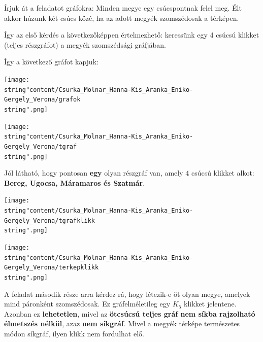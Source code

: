 \begin{solution}
	Írjuk át a feladatot gráfokra: Minden megye egy csúcspontnak
	felel meg. Élt akkor húzunk két csúcs közé, ha az adott megyék szomszédosak
	a térképen.
	
	Így az első kérdés a következőképpen értelmezhető: keressünk egy 4
	csúcsú klikket (teljes részgráfot) a megyék szomszédsági gráfjában.
	
	Így a következő gráfot kapjuk:
	\begin{center}
		\begin{minipage}[c]{0.45\textwidth}%
			\centering \texttt{[image: \\string"content/Csurka\_Molnar\_Hanna-Kis\_Aranka\_Eniko-Gergely\_Verona/grafok\\string".png]} %
		\end{minipage}\hfill{}%
		\begin{minipage}[c]{0.45\textwidth}%
			\centering \texttt{[image: \\string"content/Csurka\_Molnar\_Hanna-Kis\_Aranka\_Eniko-Gergely\_Verona/tgraf\\string".png]} %
		\end{minipage}
		\par\end{center}
	Jól látható, hogy pontosan \textbf{egy} olyan részgráf van, amely
	$4$ csúcsú klikket alkot: \textbf{Bereg, Ugocsa, Máramaros és Szatmár}.
	\begin{center}
		\begin{minipage}[c]{0.45\textwidth}%
			\centering \texttt{[image: \\string"content/Csurka\_Molnar\_Hanna-Kis\_Aranka\_Eniko-Gergely\_Verona/tgrafklikk\\string".png]} %
		\end{minipage}\hfill{}%
		\begin{minipage}[c]{0.45\textwidth}%
			\centering \texttt{[image: \\string"content/Csurka\_Molnar\_Hanna-Kis\_Aranka\_Eniko-Gergely\_Verona/terkepklikk\\string".png]} %
		\end{minipage}
		\par\end{center}
	\vspace{0.5cm}
	
	A feladat második része arra kérdez rá, hogy létezik-e öt olyan megye,
	amelyek mind páronként szomszédosak. Ez gráfelméletileg egy $K_{5}$
	klikket jelentene. Azonban ez \textbf{lehetetlen}, mivel az \textbf{ötcsúcsú
		teljes gráf nem síkba rajzolható élmetszés nélkül}, azaz \textbf{nem
		síkgráf}. Mivel a megyék térképe természetes módon síkgráf, ilyen
	klikk nem fordulhat elő.
	

\end{solution}
